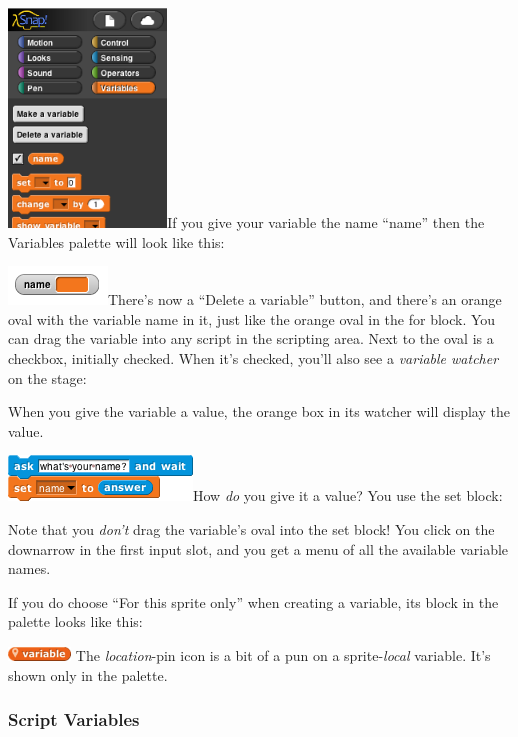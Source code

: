 \includegraphics[width=1.65833in,height=2.29167in]{media/image98.png}If
you give your variable the name ``name'' then the Variables palette will
look like this:

\includegraphics[width=1.04167in,height=0.40625in]{media/image99.png}There's
now a ``Delete a variable'' button, and there's an orange oval with the
variable name in it, just like the orange oval in the for block. You can
drag the variable into any script in the scripting area. Next to the
oval is a checkbox, initially checked. When it's checked, you'll also
see a \emph{variable watcher} on the stage:

When you give the variable a value, the orange box in its watcher will
display the value.

\includegraphics[width=1.92708in,height=0.47917in]{media/image100.png}How
\emph{do} you give it a value? You use the set block:

Note that you \emph{don't} drag the variable's oval into the set block!
You click on the downarrow in the first input slot, and you get a menu
of all the available variable names.

If you do choose ``For this sprite only'' when creating a variable, its
block in the palette looks like this:

\includegraphics[width=0.65833in,height=0.14167in]{media/image101.png}
The \emph{location}-pin icon is a bit of a pun on a sprite-\emph{local}
variable. It's shown only in the palette.

\subsubsection{Script Variables}\label{script-variables}

